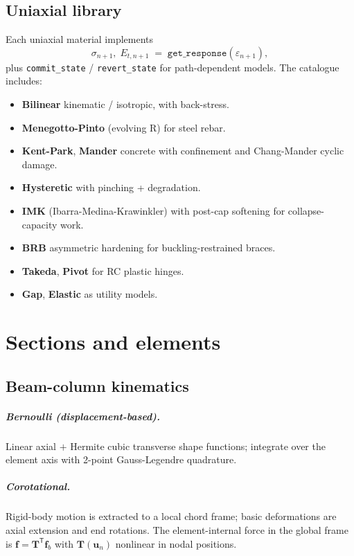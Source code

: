 \documentclass[11pt,a4paper]{report}
\newcommand{\bs}[1]{\boldsymbol{#1}}
\begin{document}
\section{Uniaxial library}

Each uniaxial material implements
\begin{equation}
  \sigma_{n+1}, \; E_{t,n+1} \;=\; \mathtt{get\_response}(\varepsilon_{n+1}),
\end{equation}
plus \texttt{commit\_state} / \texttt{revert\_state} for path-dependent
models.  The catalogue includes:

\begin{itemize}
  \item \textbf{Bilinear} kinematic / isotropic, with back-stress.
  \item \textbf{Menegotto-Pinto} (evolving R) for steel rebar.
  \item \textbf{Kent-Park}, \textbf{Mander} concrete with confinement
        and Chang-Mander cyclic damage.
  \item \textbf{Hysteretic} with pinching + degradation.
  \item \textbf{IMK} (Ibarra-Medina-Krawinkler) with post-cap softening
        for collapse-capacity work.
  \item \textbf{BRB} asymmetric hardening for buckling-restrained braces.
  \item \textbf{Takeda}, \textbf{Pivot} for RC plastic hinges.
  \item \textbf{Gap}, \textbf{Elastic} as utility models.
\end{itemize}

\chapter{Sections and elements}
\label{ch:elements}

\section{Beam-column kinematics}

\paragraph{Bernoulli (displacement-based).}  Linear axial $+$ Hermite
cubic transverse shape functions; integrate over the element axis
with 2-point Gauss-Legendre quadrature.

\paragraph{Corotational.}  Rigid-body motion is extracted to a local
chord frame; basic deformations are axial extension and end
rotations.  The element-internal force in the global frame is
$\bs f = \bs T^{\mathsf T} \bs f_b$ with $\bs T(\bs u_n)$
nonlinear in nodal positions.
\end{document}
